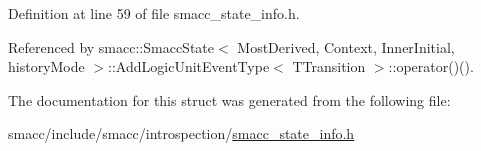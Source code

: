 Definition at line 59 of file smacc\+\_\+state\+\_\+info.\+h.



Referenced by smacc\+::\+Smacc\+State$<$ Most\+Derived, Context, Inner\+Initial, history\+Mode $>$\+::\+Add\+Logic\+Unit\+Event\+Type$<$ T\+Transition $>$\+::operator()().



The documentation for this struct was generated from the following file\+:\begin{DoxyCompactItemize}
\item 
smacc/include/smacc/introspection/\hyperlink{smacc__state__info_8h}{smacc\+\_\+state\+\_\+info.\+h}\end{DoxyCompactItemize}
